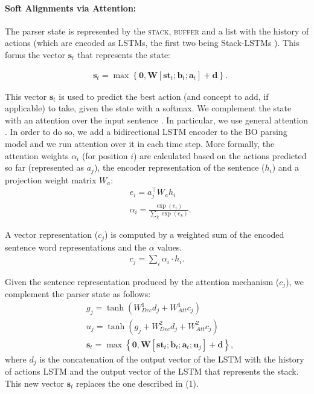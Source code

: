 \documentclass[11pt,a4paper]{article}
\begin{document}
\paragraph{Soft Alignments via Attention:}
\label{att}

The parser state is represented by the \textsc{stack}, \textsc{buffer}  and a list with the history of actions (which are encoded as LSTMs, the first two being Stack-LSTMs \cite{dyer15}). This forms the vector  $\mathbf{s}_t$ that represents the state:

\begin{align}
& \mathbf{s}_t = \max \left\{\mathbf{0}, \mathbf{W}[\mathbf{st}_t; \mathbf{b}_t; \mathbf{a}_t] + \mathbf{d}\right\}.
\end{align}



This vector $\mathbf{s}_t$ is used to predict the best action (and concept to add, if applicable) to take, given the state with a softmax. We complement the state with an attention over the input sentence \cite{bahdanau2014neural}. In particular, we use general attention \cite{DBLP:conf/emnlp/LuongPM15}. In order to do so, we add a bidirectional LSTM encoder to the BO parsing model and we run attention over it in each time step. More formally, the attention weights $\alpha_i$ (for position $i$) are calculated based on the actions predicted so far (represented as $a_j$), the encoder representation of the sentence ($h_i$) and a projection weight matrix $W_a$:
\begin{align}
& e_i = a_j^\top W_{a} h_{i} \\ 
& \alpha_i = \frac{\exp(e_i)}{\sum_k \exp(e_k)}.
\end{align}

A vector representation ($c_j$) is computed by a weighted sum of the encoded sentence word representations and the $\alpha$ values.
\begin{align}
c_j = \sum_i \alpha_i \cdot h_i.
\end{align}

Given the sentence representation produced by the attention mechanism ($c_j$), we complement the parser state as follows:
\begin{align}
& g_j = \tanh( W^1_{Dec}  d_j + W^1_{Att}  c_j  ) \\
& u_j = \tanh( g_j + W^2_{Dec}  d_j + W^2_{Att}  c_j  ) \\
&\mathbf{s}_t = \max \left\{\mathbf{0}, \mathbf{W}[\mathbf{st}_t; \mathbf{b}_t; \mathbf{a}_t; \mathbf{u}_j] + \mathbf{d}\right\},
\end{align}
where $d_j$ is the concatenation of the output vector of the LSTM with the history of actions LSTM and the output vector of the LSTM that represents the stack. This new vector $\mathbf{s}_t$ replaces the one described in (1).
\end{document}
